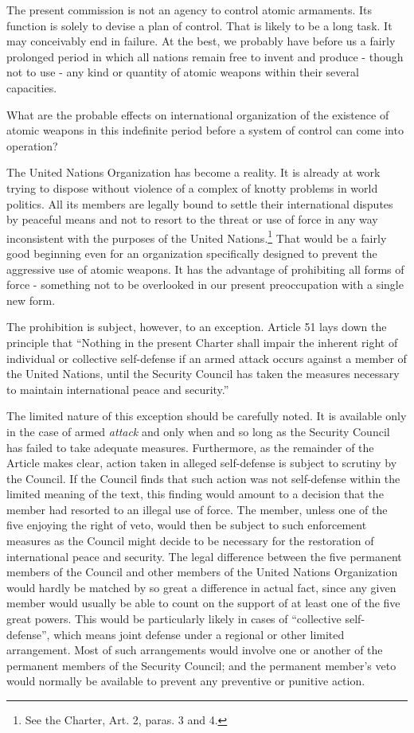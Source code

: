 The present commission is not an agency to control atomic armaments. Its function is solely to devise a plan of control. That is likely to be a long task. It may conceivably end in failure. At the best, we probably have before us a fairly prolonged period in which all nations remain free to invent and produce - though not to use - any kind or quantity of atomic weapons within their several capacities.

What are the probable effects on international organization of the existence of atomic weapons in this indefinite period before a system of control can come into operation?

The United Nations Organization has become a reality. It is already at work trying to dispose without violence of a complex of knotty problems in world politics. All its members are legally bound to settle their international disputes by peaceful means and not to resort to the threat or use of force in any way inconsistent with the purposes of the United Nations.\footnote{See the Charter, Art. 2, paras. 3 and 4.} That would be a fairly good beginning even for an organization specifically designed to prevent the aggressive use of atomic weapons. It has the advantage of prohibiting all forms of force - something not to be overlooked in our present preoccupation with a single new form.

The prohibition is subject, however, to an exception. Article 51 lays down the principle that ``Nothing in the present Charter shall impair the inherent right of individual or collective self-defense if an armed attack occurs against a member of the United Nations, until the Security Council has taken the measures necessary to maintain international peace and security.''

The limited nature of this exception should be carefully noted. It is available only in the case of armed \emph{attack} and only when and so long as the Security Council has failed to take adequate measures. Furthermore, as the remainder of the Article makes clear, action taken in alleged self-defense is subject to scrutiny by the Council. If the Council finds that such action was not self-defense within the limited meaning of the text, this finding would amount to a decision that the member had resorted to an illegal use of force. The member, unless one of the five enjoying the right of veto, would then be subject to such enforcement measures as the Council might decide to be necessary for the restoration of international peace and security. The legal difference between the five permanent members of the Council and other members of the United Nations Organization would hardly be matched by so great a difference in actual fact, since any given member would usually be able to count on the support of at least one of the five great powers. This would be particularly likely in cases of ``collective self-defense'', which means joint defense under a regional or other limited arrangement. Most of such arrangements would involve one or another of the permanent members of the Security Council; and the permanent member's veto would normally be available to prevent any preventive or punitive action.


